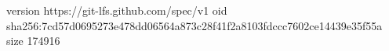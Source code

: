 version https://git-lfs.github.com/spec/v1
oid sha256:7cd57d0695273e478dd06564a873c28f41f2a8103fdccc7602ce14439e35f55a
size 174916
